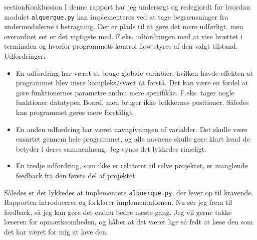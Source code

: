 section{Konklussion}
I denne rapport har jeg undersøgt og redegjordt for hvordan modulet \texttt{alquerque.py} kan implementeres
ved at tage begrænsninger fra undermodulerne i betragning. Der er plads til at gøre det mere udførligt,
men overordnet set er det vigtigste med. F.eks. udfordringen med at vise brættet i terminalen og
hvorfor programmets kontrol flow styres af den valgt tilstand.
\bigbreak
Udfordringer:
\begin{itemize}
    \item En udfordring har været at bruge globale variabler, hvilken havde effekten at programmet blev mere kompleks/svært at forstå. Det kan være en fordel at gøre funktionernes parametre endnu mere specifikke. F.eks. tager nogle funktioner datatypen Board, men bruger ikke brikkernes positioner. Således kan programmet gøres mere forståligt.
    \item En anden udfordring har været navngivningen af variabler. Det skulle være ensartet gennem hele programmet, og alle navnene skulle gøre klart hvad de betyder i deres sammenhæng. Jeg synes det lykkedes rimeligt.
    \item En tredje udfordring, som ikke er relateret til selve projektet, er manglende feedback fra den første del af projektet.
\end{itemize}
Således er det lykkedes at implementere \texttt{alquerque.py}, der lever op til kravende. Rapporten introducerer og forklarer
implementationen.
Nu ser jeg frem til feedback,
så jeg kan gøre det endnu bedre næste gang. Jeg vil gerne takke læseren for opmærksomheden, og håber at det været lige så fedt at læse den
som det har været for mig at lave den.
